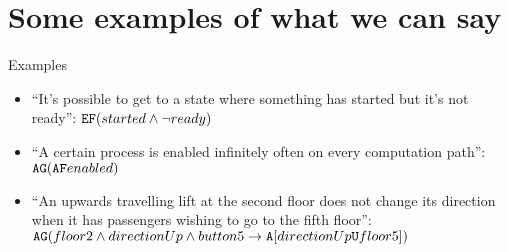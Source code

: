 \section{Some examples of what we can say}
\begin{frame}{Examples}
	\begin{itemize}
		\item 
		{
			``It's possible to get to a state where something has started but it's not ready'': $\texttt{E}\texttt{F}(started \land \neg ready)$ 
			\pause
		}
		\item
		{
			``A certain process is enabled infinitely often on every computation path'': $\texttt{A}\texttt{G}(\texttt{A}\texttt{F} enabled)$	
			\pause
		}
		\item
		{
			``An upwards travelling lift at the second floor does not change its direction when it has passengers wishing to go to the fifth floor'': $\texttt{A}\texttt{G}(floor2 \land directionUp \land button5 \to \texttt{A}[directionUp \texttt{U} floor5])$
		}
	\end{itemize}
\end{frame}